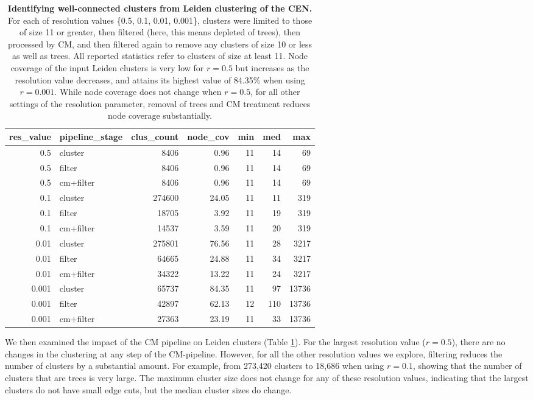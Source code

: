 \documentclass[11pt]{article}   	%
\begin{document}
\begin{table}[ht]
\centering
\begin{tabular}{rlrrrrr}
  \hline
res\_value & pipeline\_stage & clus\_count & node\_cov & min & med & max \\
  \hline
0.5 & cluster &  8406 & 0.96 &    11 & 14 &    69 \\
  0.5 & filter &  8406 & 0.96 &    11 & 14 &    69 \\
  0.5 & cm+filter &  8406 & 0.96 &    11 & 14 &    69 \\
  \hline
  0.1 & cluster & 274600 & 24.05 &    11 & 11 &   319 \\
  0.1 & filter & 18705 & 3.92 &    11 & 19 &   319 \\
  0.1 & cm+filter & 14537 & 3.59 &    11 & 20 &   319 \\
  \hline
  0.01 & cluster & 275801 & 76.56 &    11 & 28 &  3217 \\
  0.01 & filter & 64665 & 24.88 &    11 & 34 &  3217 \\
  0.01 & cm+filter & 34322 & 13.22 &    11 & 24 &  3217 \\
  \hline
  0.001 & cluster & 65737 & 84.35 &    11 & 97 & 13736 \\
  0.001 & filter & 42897 & 62.13 &    12 & 110 & 13736 \\
  0.001 & cm+filter & 27363 & 23.19 &    11 & 33 & 13736 \\
   \hline
\end{tabular}
\caption{\textbf{Identifying well-connected clusters from Leiden clustering of the CEN.} For each of resolution values \{0.5, 0.1, 0.01, 0.001\}, clusters were limited to those of size 11 or greater, then filtered (here, this means depleted of trees), then processed by CM, and then filtered again to remove any clusters of size 10 or less as well as trees. All reported statistics  refer to clusters of size at least 11.
Node coverage of the input Leiden clusters is very low for $r=0.5$ but increases as the resolution value decreases, and attains its highest value of 84.35\% when using $r=0.001$.
While node coverage does not change when $r=0.5$, for all other settings of the resolution parameter, removal of trees and CM treatment reduces node coverage substantially.}
\label{tab:CEN-Leiden-11-CM}
\end{table}

We then examined the impact of the CM pipeline on Leiden clusters (Table \ref{tab:CEN-Leiden-11-CM}).  For the largest resolution value ($r=0.5$), there are no changes in the clustering at any step of the CM-pipeline.
However, for all the other resolution values we explore, filtering reduces the number of clusters by a substantial amount. For example, from 273,420 clusters to 18,686 when using $r=0.1$, showing that the number of clusters 
that are trees is very large. The maximum cluster size does not change for any of these resolution values, indicating that the largest clusters do not have small edge cuts,  but the median cluster sizes do change.
\end{document}
